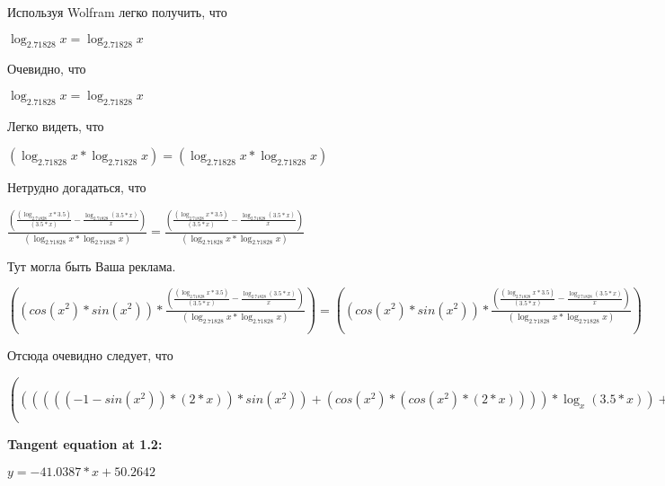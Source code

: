 \documentclass[12pt,a4paper,fleqn]{article}
\theoremstyle{definition}
\begin{document}
Используя Wolfram легко получить, что

$\log_{ 2.71828 }{ x } = \log_{ 2.71828 }{ x }$

Очевидно, что

$\log_{ 2.71828 }{ x } = \log_{ 2.71828 }{ x }$

Легко видеть, что

$(\log_{ 2.71828 }{ x } * \log_{ 2.71828 }{ x }) = (\log_{ 2.71828 }{ x } * \log_{ 2.71828 }{ x })$

Нетрудно догадаться, что

$\frac{(\frac{(\log_{ 2.71828 }{ x } *  3.5 )}{( 3.5  *  x )}
 - \frac{\log_{ 2.71828 }{( 3.5  *  x )}}{ x }
)}{(\log_{ 2.71828 }{ x } * \log_{ 2.71828 }{ x })}
 = \frac{(\frac{(\log_{ 2.71828 }{ x } *  3.5 )}{( 3.5  *  x )}
 - \frac{\log_{ 2.71828 }{( 3.5  *  x )}}{ x }
)}{(\log_{ 2.71828 }{ x } * \log_{ 2.71828 }{ x })}
$

Тут могла быть Ваша реклама.

$((cos({ x }^{ 2 }) * sin({ x }^{ 2 })) * \frac{(\frac{(\log_{ 2.71828 }{ x } *  3.5 )}{( 3.5  *  x )}
 - \frac{\log_{ 2.71828 }{( 3.5  *  x )}}{ x }
)}{(\log_{ 2.71828 }{ x } * \log_{ 2.71828 }{ x })}
) = ((cos({ x }^{ 2 }) * sin({ x }^{ 2 })) * \frac{(\frac{(\log_{ 2.71828 }{ x } *  3.5 )}{( 3.5  *  x )}
 - \frac{\log_{ 2.71828 }{( 3.5  *  x )}}{ x }
)}{(\log_{ 2.71828 }{ x } * \log_{ 2.71828 }{ x })}
)$

Отсюда очевидно следует, что

$(((((( -1  - sin({ x }^{ 2 })) * ( 2  *  x )) * sin({ x }^{ 2 })) + (cos({ x }^{ 2 }) * (cos({ x }^{ 2 }) * ( 2  *  x )))) * \log_{ x }{( 3.5  *  x )}) + ((cos({ x }^{ 2 }) * sin({ x }^{ 2 })) * \frac{(\frac{(\log_{ 2.71828 }{ x } *  3.5 )}{( 3.5  *  x )}
 - \frac{\log_{ 2.71828 }{( 3.5  *  x )}}{ x }
)}{(\log_{ 2.71828 }{ x } * \log_{ 2.71828 }{ x })}
)) = (((((( -1  - sin({ x }^{ 2 })) * ( 2  *  x )) * sin({ x }^{ 2 })) + (cos({ x }^{ 2 }) * (cos({ x }^{ 2 }) * ( 2  *  x )))) * \log_{ x }{( 3.5  *  x )}) + ((cos({ x }^{ 2 }) * sin({ x }^{ 2 })) * \frac{(\frac{(\log_{ 2.71828 }{ x } *  3.5 )}{( 3.5  *  x )}
 - \frac{\log_{ 2.71828 }{( 3.5  *  x )}}{ x }
)}{(\log_{ 2.71828 }{ x } * \log_{ 2.71828 }{ x })}
))$


\textbf{Tangent equation at 1.2:}

$y = -41.0387 * x + 50.2642$
\end{document}
